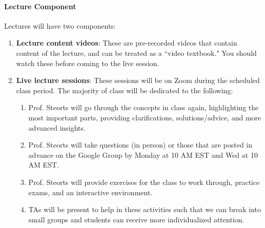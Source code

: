 \documentclass[11pt]{article}
\begin{document}
\paragraph{Lecture Component}
Lectures will have two components: 
\begin{enumerate}
\item \textbf{Lecture content videos}: These are pre-recorded videos that contain content of the lecture, and can be treated as a ``video textbook." You should watch these before coming to the live session. 
\item \textbf{Live lecture sessions}: These sessions will be on Zoom during the scheduled class period. The majority of class will be dedicated to the following:
\begin{enumerate}
\item Prof. Steorts will go through the concepts in class again, highlighting the most important parts, providing clarifications, solutions/advice, and more advanced insights. 
\item Prof. Steorts will take questions (in person) or those that are posted in advance on the Google Group by Monday at 10 AM EST and Wed at 10 AM EST. 
\item Prof. Steorts will provide exercises for the class to work through, practice exams, and an interactive environment. 
\item TAs will be present to help in these activities such that we can break into small groups and students can receive more individualized attention. 
\end{enumerate} 
\end{enumerate}
\end{document}
